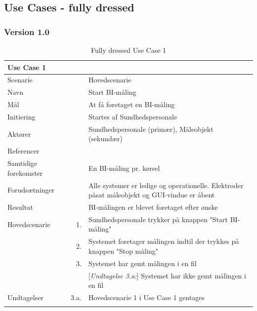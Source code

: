 \subsection{Use Cases - fully dressed}

\subsubsection{Version 1.0}

\begin{longtabu} to  %
	{\large \textbf{Use Case 1}} && \\
	\toprule
	Scenarie 				&&	Hovedscenarie\\  
	Navn 					&& 	Start BI-måling\\
	Mål 					&& 	At få foretaget en BI-måling\\
	Initiering 				&& 	Startes af Sundhedspersonale\\
	Aktører 				&& 	Sundhedspersonale (primær), Måleobjekt (sekundær)\\
	Referencer 				&& 	\\
	Samtidige forekomster  	&& 	En BI-måling pr. kørsel \\
	Forudsætninger 			&&	Alle systemer er ledige og operationelle. Elektroder påsat måleobjekt og GUI-vindue er åbent\\ 
	Resultat 				&& 	BI-målingen er blevet foretaget efter ønske\\ \midrule
	Hovedscenarie 			&    1. 	&	Sundhedspersonale trykker på knappen "Start BI-måling"\\				 	
							&    2. 	& 	Systemet foretager målingen indtil der trykkes på knappen "Stop måling" \\[-1ex]
							& 	 3.		&	 Systemet har gemt målingen i en fil \\[-1ex]
                            &&[\textit{Undtagelse 3.a:}] Systemet har ikke gemt målingen i en fil\\ \midrule
	Undtagelser 			& 3.a. & Hovedscenarie 1 i Use Case 1 gentages\\ \bottomrule
                         
	
	\caption{Fully dressed Use Case 1}
	\label{UC1}
\end{longtabu}

